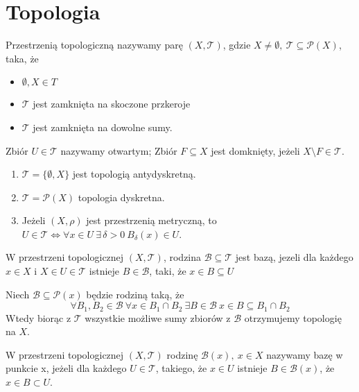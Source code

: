 \section{Topologia}
\begin{df} Przestrzenią topologiczną nazywamy parę $(X,\mathcal T)$, 
    gdzie $X \neq \emptyset,\ \mathcal T \subseteq \mathcal P (X)$, taka, że
    \begin{itemize} 
        \item $\emptyset,X \in T$
        \item $\mathcal T$ jest zamknięta na skoczone przkeroje 
        \item $\mathcal T$ jest zamknięta na dowolne sumy. 
    \end{itemize} 
    Zbiór $U \in \mathcal T$ nazywamy otwartym; Zbiór $F \subseteq X$ jest domknięty,
    jeżeli $X \setminus F \in \mathcal T$. 
\end{df} 
\begin{przy}\hfill
    \begin{enumerate}[(1)]
        \item $\mathcal T = \{ \emptyset, X \}$ jest topologią antydyskretną. 
        \item $\mathcal T = \mathcal P (X)$ topologia dyskretna. 
        \item Jeżeli $(X,\rho)$ jest przestrzenią metryczną, to $U \in \mathcal T 
            \Leftrightarrow \forall x \in U \ \exists \, \delta > 0 \ B_\delta (x) \in U$.
    \end{enumerate} 
\end{przy} 
\begin{df} 
    W przestrzeni topologicznej $(X,\mathcal T)$, rodzina $\mathcal B \subseteq \mathcal T$ jest bazą, jezeli 
    dla każdego $x \in X$ i $X \in U \in \mathcal T$ istnieje $B \in \mathcal B$, taki, że $x \in B \subseteq U$
\end{df}

\begin{tw} 
    Niech $\mathcal B \subseteq \mathcal P (x)$ będzie rodziną taką, że 
    \[ \forall B_1,B_2 \in \mathcal B \ \forall x \in B_1 \cap B_2 \ \exists B \in \mathcal B \ x \in B \subseteq 
    B_1 \cap B_2 \]
    Wtedy biorąc z $\mathcal T$ wszystkie możliwe sumy zbiorów z $\mathcal B$ otrzymujemy topologię na $X$.
\end{tw} 

\begin{df} W przestrzeni topologicznej $(X,\mathcal T)$ rodzinę $\mathcal B(x), \ x \in X$ nazywamy bazę
    w punkcie x, jeżeli dla każdego $U \in \mathcal T$, takiego, że $x \in U$ istnieje $B \in \mathcal B(x)$, że 
    $x \in B \subset U$.
\end{df} 

